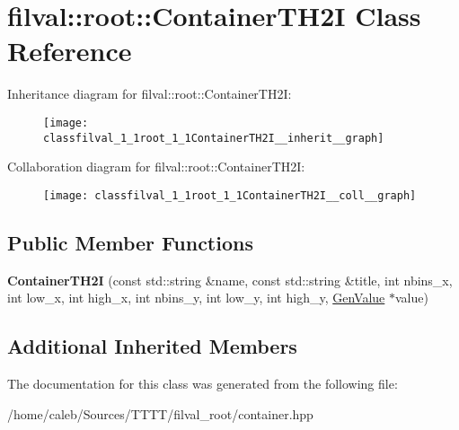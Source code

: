 \hypertarget{classfilval_1_1root_1_1ContainerTH2I}{}\section{filval\+:\+:root\+:\+:Container\+T\+H2I Class Reference}
\label{classfilval_1_1root_1_1ContainerTH2I}


Inheritance diagram for filval\+:\+:root\+:\+:Container\+T\+H2I\+:
\nopagebreak
\begin{figure}[H]
\begin{center}
\leavevmode
\texttt{[image: classfilval\_1\_1root\_1\_1ContainerTH2I\_\_inherit\_\_graph]}
\end{center}
\end{figure}


Collaboration diagram for filval\+:\+:root\+:\+:Container\+T\+H2I\+:
\nopagebreak
\begin{figure}[H]
\begin{center}
\leavevmode
\texttt{[image: classfilval\_1\_1root\_1\_1ContainerTH2I\_\_coll\_\_graph]}
\end{center}
\end{figure}
\subsection*{Public Member Functions}
\begin{DoxyCompactItemize}
\item 
\hypertarget{classfilval_1_1root_1_1ContainerTH2I_a3d241087a572abadd6fa774e3a4d384a}{}\label{classfilval_1_1root_1_1ContainerTH2I_a3d241087a572abadd6fa774e3a4d384a} 
{\bfseries Container\+T\+H2I} (const std\+::string \&name, const std\+::string \&title, int nbins\+\_\+x, int low\+\_\+x, int high\+\_\+x, int nbins\+\_\+y, int low\+\_\+y, int high\+\_\+y, \hyperlink{classfilval_1_1GenValue}{Gen\+Value} $\ast$value)
\end{DoxyCompactItemize}
\subsection*{Additional Inherited Members}


The documentation for this class was generated from the following file\+:\begin{DoxyCompactItemize}
\item 
/home/caleb/\+Sources/\+T\+T\+T\+T/filval\+\_\+root/container.\+hpp\end{DoxyCompactItemize}
